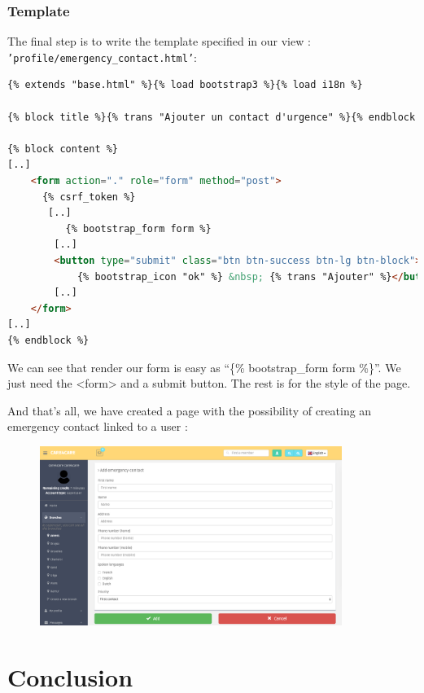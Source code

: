 \documentclass[11pt, a4paper]{article}   	%
\begin{document}
\subsubsection{Template}

The final step is to write the template specified in our view : \texttt{'profile/emergency\_contact.html'}:

\begin{lstlisting}[language=HTML, basicstyle=\footnotesize]
{% extends "base.html" %}{% load bootstrap3 %}{% load i18n %}

{% block title %}{% trans "Ajouter un contact d'urgence" %}{% endblock %}

{% block content %}
[..]
    <form action="." role="form" method="post">
      {% csrf_token %}
       [..]
          {% bootstrap_form form %}
        [..]
        <button type="submit" class="btn btn-success btn-lg btn-block">
            {% bootstrap_icon "ok" %} &nbsp; {% trans "Ajouter" %}</button>
        [..]
    </form>
[..]
{% endblock %}
\end{lstlisting}

We can see that render our form is easy as ``\{\% bootstrap\_form form \%\}''. We just need the <form> and a submit button. The rest is for the style of the page.

And that's all, we have created a page with the possibility of creating an emergency contact linked to a user :

\begin{figure}[!ht]
   \includegraphics[height=220px]{addec.png}
\end{figure}


\section{Conclusion}
\end{document}
